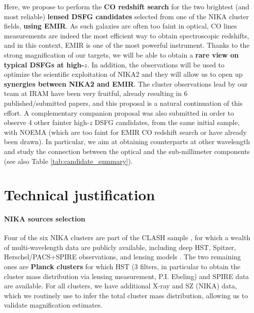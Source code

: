 \documentclass[11pt,a4paper,twoside,graphicx,color]{article}
\begin{document}
Here, we propose to perform the {\bf CO redshift search} for the two brightest (and most reliable) {\bf lensed DSFG candidates} selected from one of the NIKA cluster fields, {\bf using EMIR}. As such galaxies are often too faint in optical, CO lines measurements are indeed the most efficient way to obtain spectroscopic redshifts, and in this context, EMIR is one of the most powerful instrument. Thanks to the strong magnification of our targets, we will be able to obtain a {\bf rare view on typical DSFGs at high-$z$}. In addition, the observations will be used to optimize the scientific exploitation of NIKA2 and they will allow us to open up {\bf synergies between NIKA2 and EMIR}. The cluster observations lead by our team at IRAM have been very fruitful, already resulting in 6 published/submitted papers, and this proposal is a natural continuation of this effort. A complementary companion proposal was also submitted in order to observe 4 other fainter high-$z$ DSFG candidates, from the same initial sample, with NOEMA (which are too faint for EMIR CO redshift search or have already been drawn). In particular, we aim at obtaining counterparts at other wavelength and study the connection between the optical and the sub-millimeter components (see also Table \ref{tab:candidate_summary}).

\section{Technical justification}
\paragraph{\large NIKA sources selection}
Four of the six NIKA clusters are part of the CLASH sample \citep{Postman2012}, for which a wealth of multi-wavelength data are publicly available, including deep HST, Spitzer, Herschel/PACS+SPIRE observations, and lensing models \citep[e.g.,][]{Zitrin2015}. The two remaining ones are {\bf Planck clusters} for which HST (3 filters, in particular to obtain the cluster mass distribution via lensing measurement, P.I. Ebeling) and SPIRE data are available. For all clusters, we have additional X-ray and SZ (NIKA) data, which we routinely use to infer the total cluster mass distribution, allowing us to validate magnification estimates.
\end{document}
